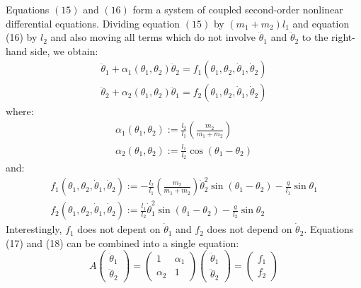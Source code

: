 \documentclass[12pt]{article}
\begin{document}
	Equations $(15)$ and $(16)$ form a system of coupled second-order nonlinear differential equations. Dividing equation $(15)$ by $\left(m_{1}+m_{2}\right) l_{1}$ and equation (16) by $l_{2}$ and also moving all terms which do not involve $\ddot{\theta}_{1}$ and $\ddot{\theta}_{2}$ to the right-hand side, we obtain:
	$$
	\begin{array}{l}
	\ddot{\theta}_{1}+\alpha_{1}\left(\theta_{1}, \theta_{2}\right) \ddot{\theta}_{2}=f_{1}\left(\theta_{1}, \theta_{2}, \dot{\theta}_{1}, \dot{\theta}_{2}\right) \\
	\ddot{\theta}_{2}+\alpha_{2}\left(\theta_{1}, \theta_{2}\right) \ddot{\theta}_{1}=f_{2}\left(\theta_{1}, \theta_{2}, \dot{\theta}_{1}, \dot{\theta}_{2}\right)
	\end{array}
	$$
	where:
	$$
	\begin{array}{l}
	\alpha_{1}\left(\theta_{1}, \theta_{2}\right):=\frac{l_{2}}{l_{1}}\left(\frac{m_{2}}{m_{1}+m_{2}}\right) \\
	\alpha_{2}\left(\theta_{1}, \theta_{2}\right):=\frac{l_{1}}{l_{2}} \cos \left(\theta_{1}-\theta_{2}\right)
	\end{array}
	$$
	and:
	$$
	\begin{array}{l}
	f_{1}\left(\theta_{1}, \theta_{2}, \dot{\theta}_{1}, \dot{\theta}_{2}\right):=-\frac{l_{2}}{l_{1}}\left(\frac{m_{2}}{m_{1}+m_{2}}\right) \dot{\theta}_{2}^{2} \sin \left(\theta_{1}-\theta_{2}\right)-\frac{g}{l_{1}} \sin \theta_{1} \\
	f_{2}\left(\theta_{1}, \theta_{2}, \dot{\theta}_{1}, \dot{\theta}_{2}\right):=\frac{l_{1}}{l_{2}} \dot{\theta}_{1}^{2} \sin \left(\theta_{1}-\theta_{2}\right)-\frac{g}{l_{2}} \sin \theta_{2}
	\end{array}
	$$
	Interestingly, $f_{1}$ does not depent on $\dot{\theta}_{1}$ and $f_{2}$ does not depend on $\dot{\theta}_{2}$. Equations (17) and (18) can be combined into a single equation:
	$$
	A\left(\begin{array}{l}
	\ddot{\theta}_{1} \\
	\ddot{\theta}_{2}
	\end{array}\right)=\left(\begin{array}{cc}
	1 & \alpha_{1} \\
	\alpha_{2} & 1
	\end{array}\right)\left(\begin{array}{c}
	\ddot{\theta}_{1} \\
	\ddot{\theta}_{2}
	\end{array}\right)=\left(\begin{array}{l}
	f_{1} \\
	f_{2}
	\end{array}\right)
	$$
\end{document}
